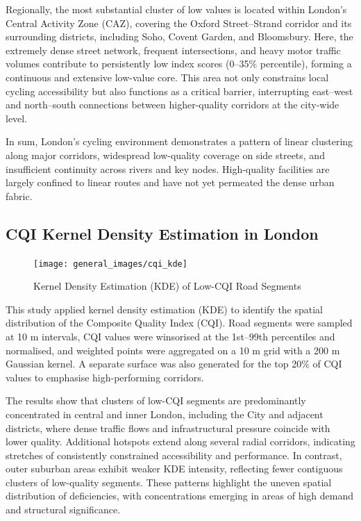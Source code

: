 \documentclass[
  12pt,
  oneside]{book}
\begin{document}
Regionally, the most substantial cluster of low values is located within London's Central Activity Zone (CAZ), covering the Oxford Street--Strand corridor and its surrounding districts, including Soho, Covent Garden, and Bloomsbury. Here, the extremely dense street network, frequent intersections, and heavy motor traffic volumes contribute to persistently low index scores (0--35\% percentile), forming a continuous and extensive low-value core. This area not only constrains local cycling accessibility but also functions as a critical barrier, interrupting east--west and north--south connections between higher-quality corridors at the city-wide level.

In sum, London's cycling environment demonstrates a pattern of linear clustering along major corridors, widespread low-quality coverage on side streets, and insufficient continuity across rivers and key nodes. High-quality facilities are largely confined to linear routes and have not yet permeated the dense urban fabric.

\subsection{CQI Kernel Density Estimation in London}\label{cqi-kernel-density-estimation-in-london}

\begin{figure}

{\centering \texttt{[image: general\_images/cqi\_kde]} 

}

\caption{Kernel Density Estimation (KDE) of Low-CQI Road Segments}\label{fig:kde}
\end{figure}

This study applied kernel density estimation (KDE) to identify the spatial distribution of the Composite Quality Index (CQI). Road segments were sampled at 10 m intervals, CQI values were winsorised at the 1st--99th percentiles and normalised, and weighted points were aggregated on a 10 m grid with a 200 m Gaussian kernel. A separate surface was also generated for the top 20\% of CQI values to emphasise high-performing corridors.

The results show that clusters of low-CQI segments are predominantly concentrated in central and inner London, including the City and adjacent districts, where dense traffic flows and infrastructural pressure coincide with lower quality. Additional hotspots extend along several radial corridors, indicating stretches of consistently constrained accessibility and performance. In contrast, outer suburban areas exhibit weaker KDE intensity, reflecting fewer contiguous clusters of low-quality segments. These patterns highlight the uneven spatial distribution of deficiencies, with concentrations emerging in areas of high demand and structural significance.
\end{document}
